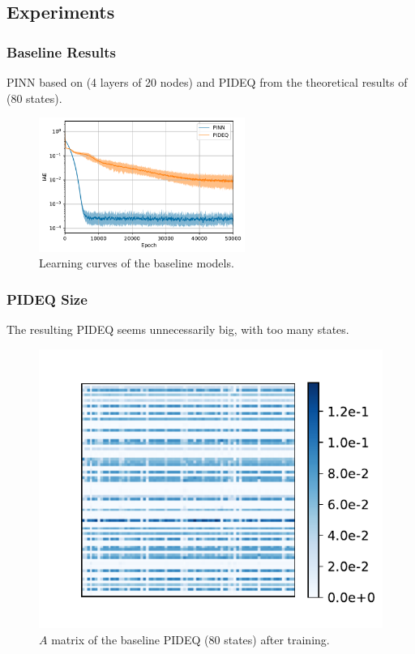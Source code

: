 \documentclass[t]{beamer}
\begin{document}
\subsection{Experiments}

\begin{frame}
    \frametitle{Baseline Results}
    PINN based on \textcite{Antonelo2021} (4 layers of 20 nodes) and PIDEQ from the theoretical results of \textcite{Ghaoui2019} (80 states).

    \begin{figure}[h]
	\centering
	\includegraphics[width=0.6\textwidth]{../images/exp_1_iae.pdf}
	\caption{Learning curves of the baseline models.}
	\label{fig:baseline-iae}
    \end{figure}
\end{frame}

\begin{frame}
    \frametitle{PIDEQ Size}
    The resulting PIDEQ seems unnecessarily big, with too many states.
    \begin{figure}[h]
	\includegraphics[width=.4\textwidth]{../images/exp_1_matplot.pdf}
	\caption{$A$ matrix of the baseline PIDEQ (80 states) after training.}
	\label{fig:baseline-pideq-A}
    \end{figure}
\end{frame}
\end{document}
